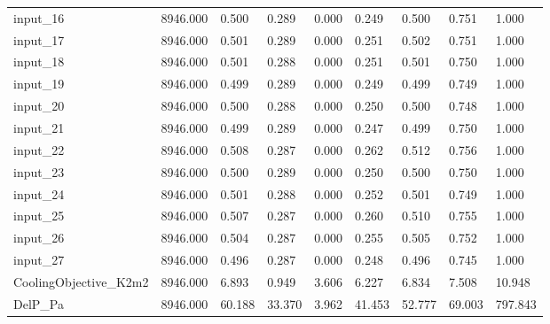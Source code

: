 \begin{longtable}{lllllllll}
input\_16 & 8946.000 & 0.500 & 0.289 & 0.000 & 0.249 & 0.500 & 0.751 & 1.000\\
input\_17 & 8946.000 & 0.501 & 0.289 & 0.000 & 0.251 & 0.502 & 0.751 & 1.000\\
input\_18 & 8946.000 & 0.501 & 0.288 & 0.000 & 0.251 & 0.501 & 0.750 & 1.000\\
input\_19 & 8946.000 & 0.499 & 0.289 & 0.000 & 0.249 & 0.499 & 0.749 & 1.000\\
input\_20 & 8946.000 & 0.500 & 0.288 & 0.000 & 0.250 & 0.500 & 0.748 & 1.000\\
input\_21 & 8946.000 & 0.499 & 0.289 & 0.000 & 0.247 & 0.499 & 0.750 & 1.000\\
input\_22 & 8946.000 & 0.508 & 0.287 & 0.000 & 0.262 & 0.512 & 0.756 & 1.000\\
input\_23 & 8946.000 & 0.500 & 0.289 & 0.000 & 0.250 & 0.500 & 0.750 & 1.000\\
input\_24 & 8946.000 & 0.501 & 0.288 & 0.000 & 0.252 & 0.501 & 0.749 & 1.000\\
input\_25 & 8946.000 & 0.507 & 0.287 & 0.000 & 0.260 & 0.510 & 0.755 & 1.000\\
input\_26 & 8946.000 & 0.504 & 0.287 & 0.000 & 0.255 & 0.505 & 0.752 & 1.000\\
input\_27 & 8946.000 & 0.496 & 0.287 & 0.000 & 0.248 & 0.496 & 0.745 & 1.000\\
CoolingObjective\_K2m2 & 8946.000 & 6.893 & 0.949 & 3.606 & 6.227 & 6.834 & 7.508 & 10.948\\
DelP\_Pa & 8946.000 & 60.188 & 33.370 & 3.962 & 41.453 & 52.777 & 69.003 & 797.843\\
\bottomrule\end{longtable}\endgroup
